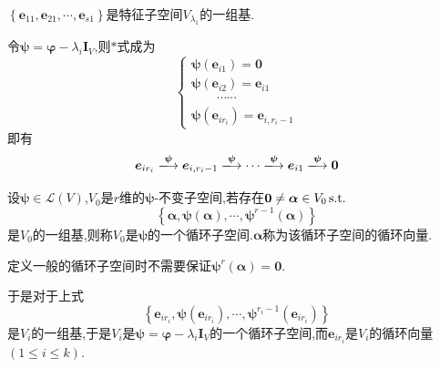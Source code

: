 \begin{green}
\begin{corollary}[特征子空间的基]\label{cor:特征子空间的基}
    $\left\{
        \bm{e}_{11},\bm{e}_{21},\cdots,\bm{e}_{s1}
    \right\}$是特征子空间$V_{\lambda_1}$的一组基.
\end{corollary}
\end{green}
令$\bm{\psi}=\bm{\varphi}-\lambda_i\bm{I}_V$,则$*$式成为\[
\begin{cases*}
    \bm{\psi}\left(\bm{e}_{i1}\right)=\bm{0}\\
    \bm{\psi}\left(\bm{e}_{i2}\right)=\bm{e}_{i1}\\
    \qquad\cdots\cdots\\
    \bm{\psi}\left(\bm{e}_{ir_i}\right)=\bm{e}_{i,r_i-1}
\end{cases*}
\]即有\[
\bm{e}_{ir_i}\xlongrightarrow{\bm{\psi}}\bm{e}_{i,r_i-1}\xlongrightarrow{\bm{\psi}}\cdots\xlongrightarrow{\bm{\psi}}\bm{e}_{i1}\xlongrightarrow{\bm{\psi}}\bm{0}
\]
\begin{formal}
\begin{definition}[循环子空间]\label{def:循环子空间}
    设$\bm{\psi}\in \mathcal{L}\left(V\right)$,$V_0$是$r$维的$\bm{\psi}$-不变子空间,若存在$\bm{0}\neq \bm{\alpha}\in V_0\,\textup{s.t.}$\[
    \left\{
        \bm{\alpha},\bm{\psi}\left(\bm{\alpha}\right),\cdots,\bm{\psi}^{r-1}\left(\bm{\alpha}\right)
    \right\}
    \]是$V_0$的一组基,则称$V_0$是$\bm{\psi}$的一个循环子空间.$\bm{\alpha}$称为该循环子空间的循环向量.
\end{definition}
\end{formal}
\begin{red}
    \begin{remark}
        定义一般的循环子空间时不需要保证$\bm{\psi}^r\left(\bm{\alpha}\right)=\bm{0}.$
    \end{remark}
\end{red}
于是对于上式\[
\left\{
    \bm{e}_{ir_i},\bm{\psi}\left(\bm{e}_{ir_i}\right),\cdots,\bm{\psi}^{r_i-1}\left(\bm{e}_{ir_i}\right)
\right\}
\]是$V_i$的一组基,于是$V_i$是$\bm{\psi}=\bm{\varphi}-\lambda_i\bm{I}_V$的一个循环子空间,而$\bm{e}_{ir_i}$是$V_i$的循环向量$\left(1\leqslant i\leqslant k\right)$.

